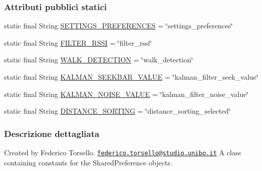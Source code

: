 \subsubsection*{Attributi pubblici statici}
\begin{DoxyCompactItemize}
\item 
static final String \hyperlink{classit_1_1unibo_1_1torsello_1_1bluetoothpositioning_1_1constant_1_1SettingConstants_ae1b406c787a7efb87d585d5c8b80493d_ae1b406c787a7efb87d585d5c8b80493d}{S\+E\+T\+T\+I\+N\+G\+S\+\_\+\+P\+R\+E\+F\+E\+R\+E\+N\+C\+ES} = \char`\"{}settings\+\_\+preferences\char`\"{}
\item 
static final String \hyperlink{classit_1_1unibo_1_1torsello_1_1bluetoothpositioning_1_1constant_1_1SettingConstants_a60a6d73ab1d42653b8a0c5b10c1c80c5_a60a6d73ab1d42653b8a0c5b10c1c80c5}{F\+I\+L\+T\+E\+R\+\_\+\+R\+S\+SI} = \char`\"{}filter\+\_\+rssi\char`\"{}
\item 
static final String \hyperlink{classit_1_1unibo_1_1torsello_1_1bluetoothpositioning_1_1constant_1_1SettingConstants_a66fa1d5e38bf015d7ec503cc2ae5448b_a66fa1d5e38bf015d7ec503cc2ae5448b}{W\+A\+L\+K\+\_\+\+D\+E\+T\+E\+C\+T\+I\+ON} = \char`\"{}walk\+\_\+detection\char`\"{}
\item 
static final String \hyperlink{classit_1_1unibo_1_1torsello_1_1bluetoothpositioning_1_1constant_1_1SettingConstants_a7ba43b29e467efb129d86c917734c94b_a7ba43b29e467efb129d86c917734c94b}{K\+A\+L\+M\+A\+N\+\_\+\+S\+E\+E\+K\+B\+A\+R\+\_\+\+V\+A\+L\+UE} = \char`\"{}kalman\+\_\+filter\+\_\+seek\+\_\+value\char`\"{}
\item 
static final String \hyperlink{classit_1_1unibo_1_1torsello_1_1bluetoothpositioning_1_1constant_1_1SettingConstants_a2751989834b974103dda417fb8b10337_a2751989834b974103dda417fb8b10337}{K\+A\+L\+M\+A\+N\+\_\+\+N\+O\+I\+S\+E\+\_\+\+V\+A\+L\+UE} = \char`\"{}kalman\+\_\+filter\+\_\+noise\+\_\+value\char`\"{}
\item 
static final String \hyperlink{classit_1_1unibo_1_1torsello_1_1bluetoothpositioning_1_1constant_1_1SettingConstants_ad86af94213ec3f11669289c4972c7658_ad86af94213ec3f11669289c4972c7658}{D\+I\+S\+T\+A\+N\+C\+E\+\_\+\+S\+O\+R\+T\+I\+NG} = \char`\"{}distance\+\_\+sorting\+\_\+selected\char`\"{}
\end{DoxyCompactItemize}


\subsubsection{Descrizione dettagliata}
Created by Federico Torsello. \href{mailto:federico.torsello@studio.unibo.it}{\tt federico.\+torsello@studio.\+unibo.\+it} A class containing constants for the Shared\+Preference objects. 

